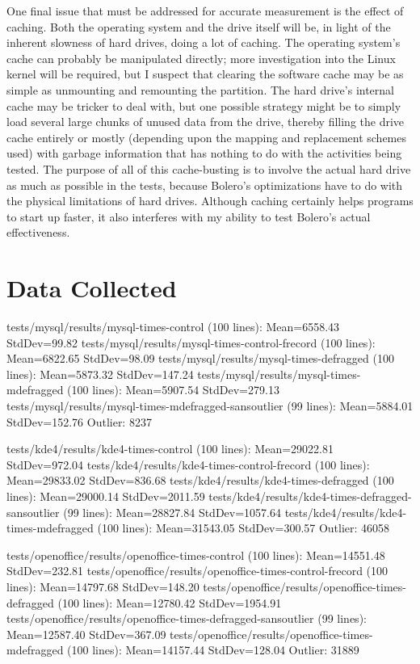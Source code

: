 \documentclass[10pt,twocolumn]{article}
\begin{document}
One final issue that must be addressed for accurate measurement is the effect of caching. Both
the operating system and the drive itself will be, in light of the inherent slowness of hard drives,
doing a lot of caching. The operating system's cache can probably be manipulated directly; more
investigation into the Linux kernel will be required, but I suspect that clearing the software
cache may be as simple as unmounting and remounting the partition. The hard drive's internal cache
may be tricker to deal with, but one possible strategy might be to simply load several large chunks of
unused data from the drive, thereby filling the drive cache entirely or mostly (depending upon the mapping
and replacement schemes used) with garbage information that has nothing to do with the activities being tested.
The purpose of all of this cache-busting is to involve the actual hard drive as much as possible
in the tests, because Bolero's optimizations have to do with the physical limitations of hard drives. Although caching certainly helps programs to start up faster, it also interferes with my ability to test Bolero's actual effectiveness.

\section{Data Collected}

tests/mysql/results/mysql-times-control (100 lines):  Mean=6558.43  StdDev=99.82
tests/mysql/results/mysql-times-control-frecord (100 lines):  Mean=6822.65  StdDev=98.09
tests/mysql/results/mysql-times-defragged (100 lines):  Mean=5873.32  StdDev=147.24
tests/mysql/results/mysql-times-mdefragged (100 lines):  Mean=5907.54  StdDev=279.13
tests/mysql/results/mysql-times-mdefragged-sansoutlier (99 lines):  Mean=5884.01  StdDev=152.76
Outlier: 8237

tests/kde4/results/kde4-times-control (100 lines):  Mean=29022.81  StdDev=972.04
tests/kde4/results/kde4-times-control-frecord (100 lines):  Mean=29833.02  StdDev=836.68
tests/kde4/results/kde4-times-defragged (100 lines):  Mean=29000.14  StdDev=2011.59
tests/kde4/results/kde4-times-defragged-sansoutlier (99 lines):  Mean=28827.84  StdDev=1057.64
tests/kde4/results/kde4-times-mdefragged (100 lines):  Mean=31543.05  StdDev=300.57
Outlier: 46058

tests/openoffice/results/openoffice-times-control (100 lines):  Mean=14551.48  StdDev=232.81
tests/openoffice/results/openoffice-times-control-frecord (100 lines):  Mean=14797.68  StdDev=148.20
tests/openoffice/results/openoffice-times-defragged (100 lines):  Mean=12780.42  StdDev=1954.91
tests/openoffice/results/openoffice-times-defragged-sansoutlier (99 lines):  Mean=12587.40  StdDev=367.09
tests/openoffice/results/openoffice-times-mdefragged (100 lines):  Mean=14157.44  StdDev=128.04
Outlier: 31889
\end{document}
